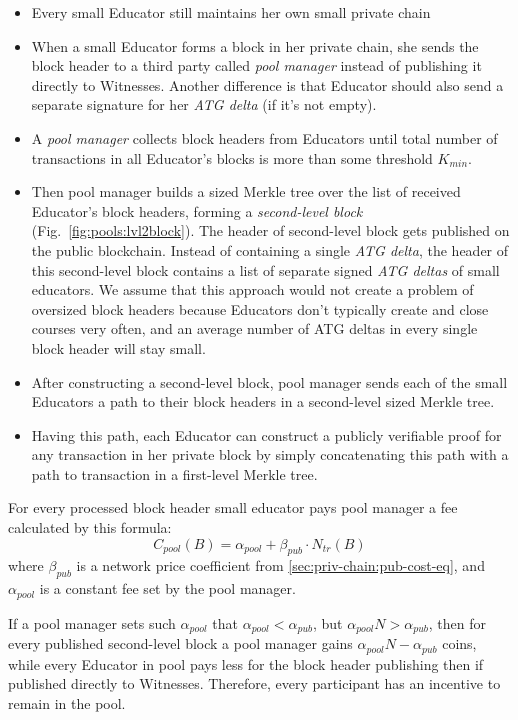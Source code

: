 \begin{itemize}
\item Every small Educator still maintains her own small private chain
\item When a small Educator forms a block in her private chain, she sends the
  block header to a third party called \textit{pool manager} instead of
  publishing it directly to Witnesses. Another difference is that Educator
  should also send a separate signature for her \textit{ATG delta} (if it's not
  empty).
\item A \textit{pool manager} collects block headers from Educators until
  total number of transactions in all Educator's blocks is more than some
  threshold $K_{min}$.
\item Then pool manager builds a sized Merkle tree over the list of received
  Educator's block headers, forming a \textit{second-level block}
  (Fig.~\ref{fig:pools:lvl2block}). The header of second-level block gets published
  on the public blockchain. Instead of containing a single \textit{ATG delta},
  the header of this second-level block contains a list of separate signed
  \textit{ATG deltas} of small educators. We assume that this approach would
  not create a problem of oversized block headers because Educators don't
  typically create and close courses very often, and an average number of ATG
  deltas in every single block header will stay small.
\item After constructing a second-level block, pool manager sends each of the
  small Educators a path to their block headers in a second-level sized Merkle tree.
\item Having this path, each Educator can construct a publicly verifiable proof
  for any transaction in her private block by simply concatenating this path
  with a path to transaction in a first-level Merkle tree.
\end{itemize}

For every processed block header small educator pays pool manager a fee
calculated by this formula:
\begin{equation}\label{apx:pools:pools-cost-eq}
  C_{pool}(B) = \alpha_{pool} + \beta_{pub} \cdot N_{tr}(B)
\end{equation}
where $\beta_{pub}$ is a network price coefficient from
\ref{sec:priv-chain:pub-cost-eq}, and $\alpha_{pool}$ is a constant fee set by
the pool manager.

If a pool manager sets such $\alpha_{pool}$ that
$\alpha_{pool} < \alpha_{pub}$, but $\alpha_{pool} N > \alpha_{pub}$, then for
every published second-level block a pool manager gains
$\alpha_{pool} N - \alpha_{pub}$ coins, while every Educator in pool pays less
for the block header publishing then if published directly to Witnesses.
Therefore, every participant has an incentive to remain in the pool.

